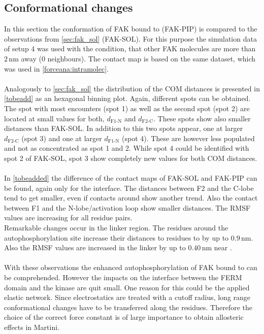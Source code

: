 \subsection{Conformational changes}
In this section the conformation of FAK bound to \pip{} (FAK-PIP) is compared to the observations from \autoref{sec:fak_sol} (FAK-SOL). For this purpose the simulation data of setup 4 was used with the condition, that other FAK molecules are more than $2\,\si{\nano\metre}$ away (0 neighbours). The contact map is based on the same dataset, which was used in \autoref{forceana:intramolec}.\\
\\
Analogously to \autoref{sec:fak_sol} the distribution of the COM distances is presented in \autoref{tobeadd} as an hexagonal binning plot. Again, different spots can be obtained. The spot with most encounters (spot 1) as well as the second spot (spot 2) are located at small values for both, $d_\text{F1-N}$ and $d_\text{F2-C}$. These spots show also smaller distances than FAK-SOL. In addition to this two spots appear, one at larger $d_\text{F2-C}$ (spot 3) and one at larger $d_\text{F1-N}$ (spot 4). These are however less populated and not as concentrated as spot 1 and 2. While spot 4 could be identified with spot 2 of FAK-SOL, spot 3 show completely new values for both COM distances.\\
\\
In \autoref{tobeadded} the difference of the contact maps of FAK-SOL and FAK-PIP can be found, again only for the interface. The distances between F2 and the C-lobe tend to get smaller, even if contacts around  show another trend. Also the contact between F1 and the N-lobe/activation loop show smaller distances. The RMSF values are increasing for all residue pairs.\\
Remarkable changes occur in the linker region. The residues around the autophosphorylation site  increase their distances to residues  to  by up to $0.9\,\si{\nano\metre}$. Also the RMSF values are increased in the linker by up to $0.40\,\si{\nano\metre}$ near .\\
\\
With these observations the enhanced autophosphorylation of FAK bound to \pip{} can be comprehended. However the impacts on the interface between the FERM domain and the kinase are quit small. One reason for this could be the applied elastic network. Since electrostatics are treated with a cutoff radius, long range conformational changes have to be transferred along the residues. Therefore the choice of the correct force constant is of large importance to obtain allosteric effects in Martini.